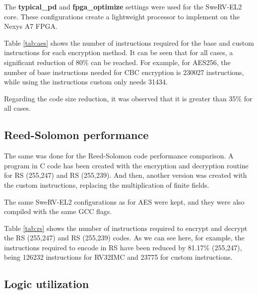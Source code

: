The \textbf{typical\_pd} and \textbf{fpga\_optimize} settings were used for the SweRV-EL2 core. These configurations create a lightweight processor to implement on the Nexys A7 FPGA.

Table \ref{tab:aes} shows the number of instructions required for the base and custom instructions for each encryption method. It can be seen that for all cases, a significant reduction of 80\% can be reached. 
For example, for AES256, the number of base instructions needed for CBC encryption is 230027 instructions, while using the instructions custom only needs 31434.

Regarding the code size reduction, it was observed that it is greater than 35\% for all cases.

\subsection{Reed-Solomon performance} 

The same was done for the Reed-Solomon code performance comparison. A program in C code has been created with the encryption and decryption routine for RS (255,247) and RS (255,239). And then, another 
version was created with the custom instructions, replacing the multiplication of finite fields.

The same SweRV-EL2 configurations as for AES were kept, and they were also compiled with the same GCC flags.

Table \ref{tab:rs} shows the number of instructions required to encrypt and decrypt the RS (255,247) and RS (255,239) codes. 
As we can see here, for example, the instructions required to encode in RS have been reduced by 81.17\% (255,247), 
being 126232 instructions for RV32IMC and 23775 for custom instructions.

\subsection{Logic utilization} 

